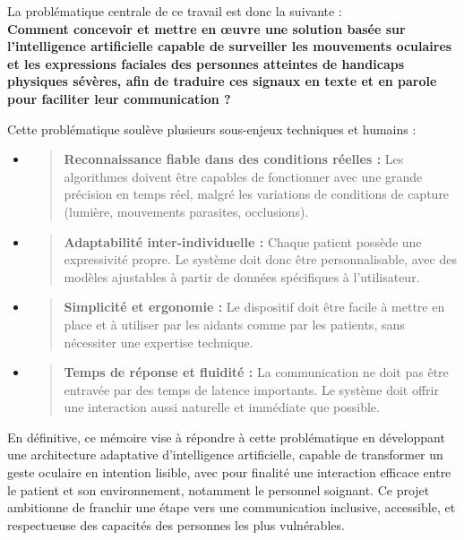 \documentclass[
]{article}
\begin{document}
La problématique centrale de ce travail est donc la suivante :\\
\textbf{Comment concevoir et mettre en œuvre une solution basée sur l'intelligence artificielle capable de surveiller les mouvements oculaires et les expressions faciales des personnes atteintes de handicaps physiques sévères, afin de traduire ces signaux en texte et en parole pour faciliter leur communication ?}

Cette problématique soulève plusieurs sous-enjeux techniques et humains :

\begin{itemize}
\item
  \begin{quote}
  \textbf{Reconnaissance fiable dans des conditions réelles :} Les algorithmes doivent être capables de fonctionner avec une grande précision en temps réel, malgré les variations de conditions de capture (lumière, mouvements parasites, occlusions).
  \end{quote}
\item
  \begin{quote}
  \textbf{Adaptabilité inter-individuelle :} Chaque patient possède une expressivité propre. Le système doit donc être personnalisable, avec des modèles ajustables à partir de données spécifiques à l'utilisateur.
  \end{quote}
\item
  \begin{quote}
  \textbf{Simplicité et ergonomie :} Le dispositif doit être facile à mettre en place et à utiliser par les aidants comme par les patients, sans nécessiter une expertise technique.
  \end{quote}
\item
  \begin{quote}
  \textbf{Temps de réponse et fluidité :} La communication ne doit pas être entravée par des temps de latence importants. Le système doit offrir une interaction aussi naturelle et immédiate que possible.
  \end{quote}
\end{itemize}

En définitive, ce mémoire vise à répondre à cette problématique en développant une architecture adaptative d'intelligence artificielle, capable de transformer un geste oculaire en intention lisible, avec pour finalité une interaction efficace entre le patient et son environnement, notamment le personnel soignant. Ce projet ambitionne de franchir une étape vers une communication inclusive, accessible, et respectueuse des capacités des personnes les plus vulnérables.
\end{document}
